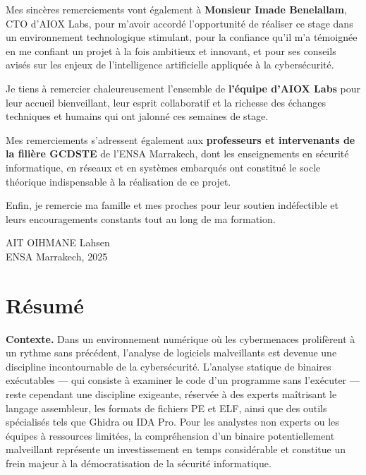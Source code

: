 Mes sincères remerciements vont également à \textbf{Monsieur Imade Benelallam}, CTO d'AIOX Labs, pour m'avoir accordé l'opportunité de réaliser ce stage dans un environnement technologique stimulant, pour la confiance qu'il m'a témoignée en me confiant un projet à la fois ambitieux et innovant, et pour ses conseils avisés sur les enjeux de l'intelligence artificielle appliquée à la cybersécurité.

Je tiens à remercier chaleureusement l'ensemble de \textbf{l'équipe d'AIOX Labs} pour leur accueil bienveillant, leur esprit collaboratif et la richesse des échanges techniques et humains qui ont jalonné ces semaines de stage.

Mes remerciements s'adressent également aux \textbf{professeurs et intervenants de la filière GCDSTE} de l'ENSA Marrakech, dont les enseignements en sécurité informatique, en réseaux et en systèmes embarqués ont constitué le socle théorique indispensable à la réalisation de ce projet.

Enfin, je remercie ma famille et mes proches pour leur soutien indéfectible et leurs encouragements constants tout au long de ma formation.

\vspace{1cm}
\begin{flushright}
  AIT OIHMANE Lahsen\\
  ENSA Marrakech, 2025
\end{flushright}

\clearpage
\chapter*{Résumé}

\textbf{Contexte.} Dans un environnement numérique où les cybermenaces prolifèrent à un rythme sans précédent, l'analyse de logiciels malveillants est devenue une discipline incontournable de la cybersécurité. L'analyse statique de binaires exécutables --- qui consiste à examiner le code d'un programme sans l'exécuter --- reste cependant une discipline exigeante, réservée à des experts maîtrisant le langage assembleur, les formats de fichiers PE et ELF, ainsi que des outils spécialisés tels que Ghidra ou IDA Pro. Pour les analystes non experts ou les équipes à ressources limitées, la compréhension d'un binaire potentiellement malveillant représente un investissement en temps considérable et constitue un frein majeur à la démocratisation de la sécurité informatique.

